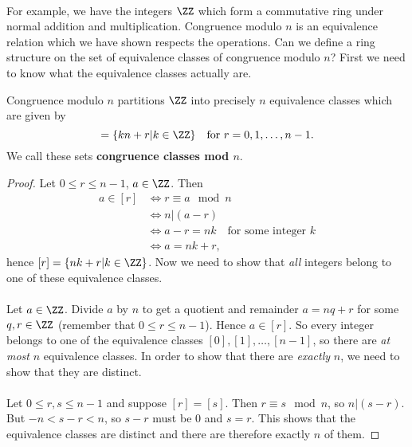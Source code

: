 \documentclass[../abstract_algebra.tex]{subfiles}
\begin{document}
        \paragraph{}
        For example, we have the integers $\ZZ$ which form a commutative ring under normal addition and multiplication.
        Congruence modulo $n$ is an equivalence relation which we have shown respects the operations.
        Can we define a ring structure on the set of equivalence classes of congruence modulo $n$?
        First we need to know what the equivalence classes actually are.
        \begin{theorem}
            Congruence modulo $n$ partitions $\ZZ$ into precisely $n$ equivalence classes which are given by
            \begin{equation}
                [r]=\{kn+r|k\in\ZZ\}\quad\text{for }r=0,1,\dots,n-1.
            \end{equation}
            We call these sets \textbf{congruence classes mod $n$}.
        \end{theorem}
        \begin{proof}
            Let $0\leq r\leq n-1$, $a\in\ZZ$. Then
            \begin{align}
                a\in[r]&\iff r\equiv a\mod n\\
                &\iff n|(a-r)\\
                &\iff a-r=nk\quad\text{for some integer }k\\
                &\iff a=nk+r,
            \end{align}
            hence $[r]=\{nk+r|k\in\ZZ\}$.
            Now we need to show that \textit{all} integers belong to one of these equivalence classes.

            \paragraph{}
            Let $a\in\ZZ$. Divide $a$ by $n$ to get a quotient and remainder $a=nq+r$ for some $q,r\in\ZZ$ (remember that $0\leq r\leq n-1$).
            Hence $a\in[r]$.
            So every integer belongs to one of the equivalence classes $[0],[1],\dots,[n-1]$, so there are \textit{at most} $n$ equivalence classes.
            In order to show that there are \textit{exactly} $n$, we need to show that they are distinct.

            \paragraph{}
            Let $0\leq r,s\leq n-1$ and suppose $[r]=[s]$.
            Then $r\equiv s\mod n$, so $n|(s-r)$.
            But $-n<s-r<n$, so $s-r$ must be 0 and $s=r$.
            This shows that the equivalence classes are distinct and there are therefore exactly $n$ of them.
        \end{proof}
\end{document}
